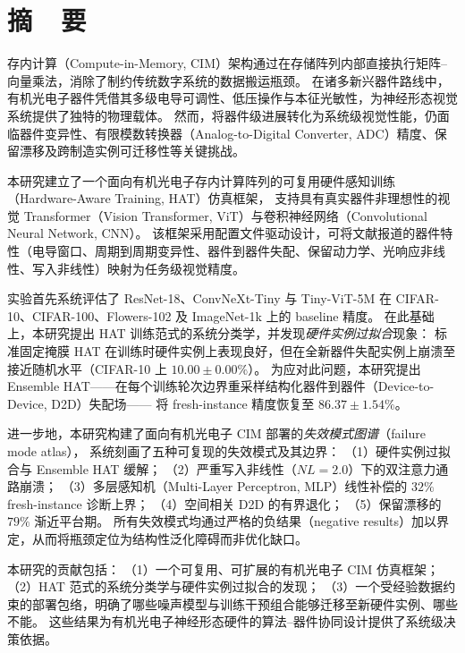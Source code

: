 
\chapter*{摘\ \ 要}

存内计算（Compute-in-Memory, CIM）架构通过在存储阵列内部直接执行矩阵--向量乘法，消除了制约传统数字系统的数据搬运瓶颈。
在诸多新兴器件路线中，有机光电子器件凭借其多级电导可调性、低压操作与本征光敏性，为神经形态视觉系统提供了独特的物理载体。
然而，将器件级进展转化为系统级视觉性能，仍面临器件变异性、有限模数转换器（Analog-to-Digital Converter, ADC）精度、保留漂移及跨制造实例可迁移性等关键挑战。

本研究建立了一个面向有机光电子存内计算阵列的可复用硬件感知训练（Hardware-Aware Training, HAT）仿真框架，
支持具有真实器件非理想性的视觉 Transformer（Vision Transformer, ViT）与卷积神经网络（Convolutional Neural Network, CNN）。
该框架采用配置文件驱动设计，可将文献报道的器件特性（电导窗口、周期到周期变异性、器件到器件失配、保留动力学、光响应非线性、写入非线性）映射为任务级视觉精度。

实验首先系统评估了 ResNet-18、ConvNeXt-Tiny 与 Tiny-ViT-5M 在 CIFAR-10、CIFAR-100、Flowers-102 及 ImageNet-1k 上的 baseline 精度。
在此基础上，本研究提出 HAT 训练范式的系统分类学，并发现\emph{硬件实例过拟合}现象：
标准固定掩膜 HAT 在训练时硬件实例上表现良好，但在全新器件失配实例上崩溃至接近随机水平（CIFAR-10 上 $10.00\pm0.00\%$）。
为应对此问题，本研究提出 Ensemble HAT——在每个训练轮次边界重采样结构化器件到器件（Device-to-Device, D2D）失配场——
将 fresh-instance 精度恢复至 $86.37\pm1.54\%$。

进一步地，本研究构建了面向有机光电子 CIM 部署的\emph{失效模式图谱}（failure mode atlas），
系统刻画了五种可复现的失效模式及其边界：
（1）硬件实例过拟合与 Ensemble HAT 缓解；
（2）严重写入非线性（$NL=2.0$）下的双注意力通路崩溃；
（3）多层感知机（Multi-Layer Perceptron, MLP）线性补偿的 $32\%$ fresh-instance 诊断上界；
（4）空间相关 D2D 的有界退化；
（5）保留漂移的 $79\%$ 渐近平台期。
所有失效模式均通过严格的负结果（negative results）加以界定，从而将瓶颈定位为结构性泛化障碍而非优化缺口。

本研究的贡献包括：
（1）一个可复用、可扩展的有机光电子 CIM 仿真框架；
（2）HAT 范式的系统分类学与硬件实例过拟合的发现；
（3）一个受经验数据约束的部署包络，明确了哪些噪声模型与训练干预组合能够迁移至新硬件实例、哪些不能。
这些结果为有机光电子神经形态硬件的算法--器件协同设计提供了系统级决策依据。

